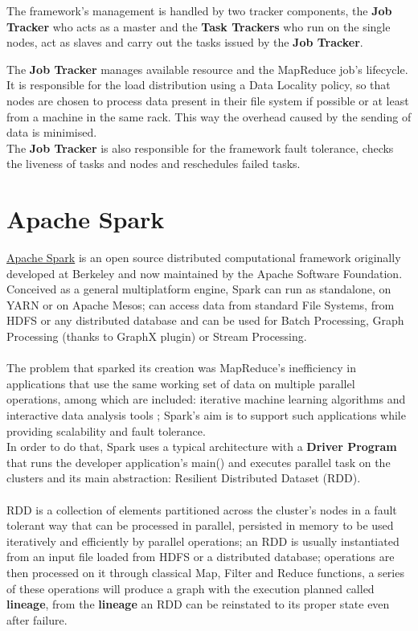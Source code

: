 The framework's management is handled by two tracker components, the \textbf{Job Tracker} who acts as a master and the \textbf{Task Trackers} who run on the single nodes, act as slaves and carry out the tasks issued by the \textbf{Job Tracker}.

The \textbf{Job Tracker} manages available resource and the MapReduce job's lifecycle.\\ It is responsible for the load distribution using a Data Locality policy, so that nodes are chosen to process data present in their file system if possible or at least from a machine in the same rack. This way the overhead caused by the sending of data is minimised.
\\
The \textbf{Job Tracker} is also responsible for the framework fault tolerance, checks the liveness of tasks and nodes and reschedules failed tasks.
 \pagebreak
 
\section{Apache Spark} \label{Spark}

\href{https://spark.apache.org/}{Apache Spark} is an open source distributed computational framework originally developed at Berkeley and now maintained by the Apache Software Foundation.
\\
Conceived as a general multiplatform engine, Spark can run as standalone, on YARN or on Apache Mesos; can access data from standard File Systems, from HDFS or any distributed database and can be used for Batch Processing, Graph Processing (thanks to GraphX plugin) or Stream Processing.
\\
\\
The problem that sparked its creation was MapReduce's inefficiency in applications that use the same working set of data on multiple parallel operations, among which are included: iterative machine learning algorithms and interactive data analysis tools \cite{Zaharia:2010:SCC:1863103.1863113}; Spark's aim is to support such applications while providing scalability and fault tolerance.
\\
In order to do that, Spark uses a typical architecture with a \textbf{Driver Program} that runs the developer application's main() and executes parallel task on the clusters and its main abstraction: Resilient Distributed Dataset (RDD).
\\
\\
RDD is a collection of elements partitioned across the cluster's nodes in a fault tolerant way that can be processed in parallel, persisted in memory to be used iteratively and efficiently by parallel operations; an RDD is usually instantiated from an input file loaded from HDFS or a distributed database; operations are then processed on it through classical Map, Filter and Reduce functions, a series of these operations will produce a graph with the execution planned called \textbf{lineage}, from the \textbf{lineage} an RDD can be reinstated to its proper state even after failure.

